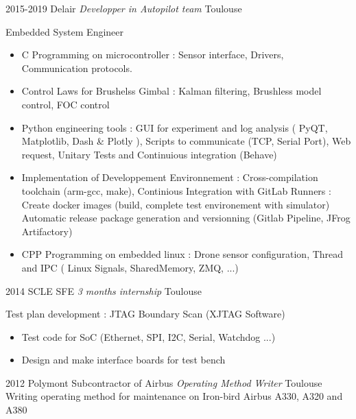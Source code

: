 \documentclass[a4paper]{friggeri-cv} %
\begin{document}
\begin{entrylist}
\entry
{2015-2019}
{Delair \textit{Developper in Autopilot team}}
{Toulouse}
{Embedded System Engineer
\begin{itemize}
\item C Programming on microcontroller : Sensor interface, Drivers, Communication protocols.
\item Control Laws for Brushelss Gimbal : Kalman filtering, Brushless model control, FOC control
\item Python engineering tools : GUI for experiment and log analysis ( PyQT, Matplotlib, Dash \& Plotly ), Scripts to communicate (TCP, Serial Port), Web request, Unitary Tests and Continuious integration (Behave)
\item Implementation of Developpement Environnement : Cross-compilation toolchain (arm-gcc, make), Continious Integration with GitLab Runners : Create docker images (build, complete test environement with simulator) Automatic release package generation and versionning (Gitlab Pipeline, JFrog Artifactory)
\item CPP Programming on embedded linux : Drone sensor configuration, Thread and IPC (  Linux Signals, SharedMemory, ZMQ, ...)
\end{itemize}
%
}
\entry
{2014}
{SCLE SFE \textit{3 months internship}}
{Toulouse}
{Test plan development : JTAG Boundary Scan (XJTAG Software)
\begin{itemize}
\item Test code for SoC (Ethernet, SPI, I2C, Serial, Watchdog ...)
\item Design and make interface boards for test bench
\end{itemize}
}

\entry
{2012}
{Polymont Subcontractor of Airbus \textit{Operating Method Writer}}
{Toulouse}
{ Writing operating method for maintenance on Iron-bird Airbus A330, A320 and A380 }




\end{entrylist}
\end{document}
